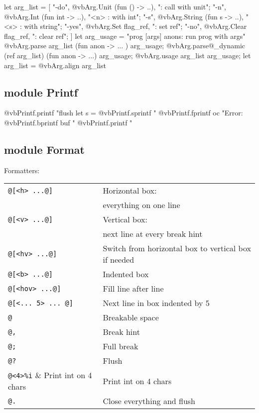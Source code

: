 \documentclass[10pt,landscape]{article}
\begin{document}
\begin{multicols}{3}
\begin{Verbacorner}
let arg_list = [
  "-do", {@vb{}Arg.Unit} (fun () -> ..), ": call with unit";
 "-n", {@vb{}Arg.Int} (fun int -> ..), "<n> : with int";
 "-s", {@vb{}Arg.String} (fun s -> ..), "<s> : with string";
 "-yes", {@vb{}Arg.Set} flag_ref, ": set ref";
 "-no", {@vb{}Arg.Clear} flag_ref, ": clear ref";
]
let arg_usage = "prog [args] anons: run prog with args"
{@vb{}Arg.parse} arg_list (fun anon -> ... ) arg_usage;
{@vb{}Arg.parse@_dynamic}
    (ref arg_list) (fun anon -> ...) arg_usage;
{@vb{}Arg.usage} arg_list arg_usage;
let arg_list = {@vb{}Arg.align} arg_list
\end{Verbacorner}

\subsection{module Printf}

\begin{Verbacorner}
{@vb{}Printf.printf} "flush\n%
let s = {@vb{}Printf.sprintf} "%
{@vb{}Printf.fprintf} oc "Error: %
{@vb{}Printf.bprintf} buf "%
{@vb{}Printf.printf} "%
\end{Verbacorner}

\subsection{module Format}

\begin{topleft}
Formatters:\\
\begin{tabular}{lp{4cm}}
  \verb!@[<h> ...@]! & Horizontal box:\\
  & everything on one line\\
  \verb!@[<v> ...@]! & Vertical box:\\
  & next line at every break hint\\
\verb!@[<hv> ...@]! & Switch from horizontal box to vertical box if needed \\
\verb!@[<b> ...@]! & Indented box\\
\verb!@[<hov> ...@]! & Fill line after line \\
\verb!@[<... 5> ... @]! & Next line in box indented by 5 \\
\verb!@!\textvisiblespace & Breakable space \\
\verb!@,! & Break hint \\
\verb!@;! & Full break \\
\verb!@?! & Flush \\
\verb!@<4>%i! & Print int on 4 chars\\
\verb!@.! & Close everything and flush \\
\end{tabular}
\end{topleft}


\end{multicols}
\end{document}
